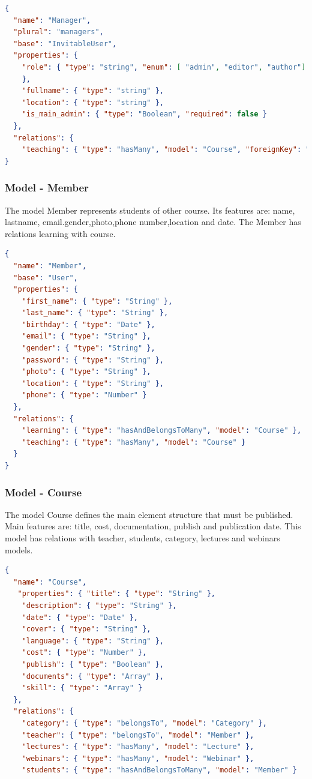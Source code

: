 \begin{lstlisting}[language=json]
{
  "name": "Manager",
  "plural": "managers",
  "base": "InvitableUser",
  "properties": {
    "role": { "type": "string", "enum": [ "admin", "editor", "author"]
    },
    "fullname": { "type": "string" },
    "location": { "type": "string" },
    "is_main_admin": { "type": "Boolean", "required": false }
  },
  "relations": {
    "teaching": { "type": "hasMany", "model": "Course", "foreignKey": "teacher_id" }
}
\end{lstlisting}


\subsubsection{ Model - Member}

The model Member represents students of other course. Its features are: name, lastname, email.gender,photo,phone number,location and date. The Member has relations learning with course.

\begin{lstlisting}[language=json]
{
  "name": "Member",
  "base": "User",
  "properties": {
    "first_name": { "type": "String" },
    "last_name": { "type": "String" },   
    "birthday": { "type": "Date" },
    "email": { "type": "String" },
    "gender": { "type": "String" },
    "password": { "type": "String" },
    "photo": { "type": "String" },
    "location": { "type": "String" },
    "phone": { "type": "Number" }
  },
  "relations": {
    "learning": { "type": "hasAndBelongsToMany", "model": "Course" },
    "teaching": { "type": "hasMany", "model": "Course" }
  }
}
\end{lstlisting}


\subsubsection{ Model - Course}

The model Course defines the main element structure that must be published. Main features are: title, cost, documentation, publish and publication date. This model has relations with teacher, students, category, lectures and webinars models.


\begin{lstlisting}[language=json]
{
  "name": "Course",
   "properties": { "title": { "type": "String" },
    "description": { "type": "String" },
    "date": { "type": "Date" },
    "cover": { "type": "String" },
    "language": { "type": "String" },
    "cost": { "type": "Number" },
    "publish": { "type": "Boolean" },
    "documents": { "type": "Array" },
    "skill": { "type": "Array" }
  },
  "relations": {
    "category": { "type": "belongsTo", "model": "Category" },
    "teacher": { "type": "belongsTo", "model": "Member" },
    "lectures": { "type": "hasMany", "model": "Lecture" },
    "webinars": { "type": "hasMany", "model": "Webinar" },
    "students": { "type": "hasAndBelongsToMany", "model": "Member" }

\end{lstlisting}

